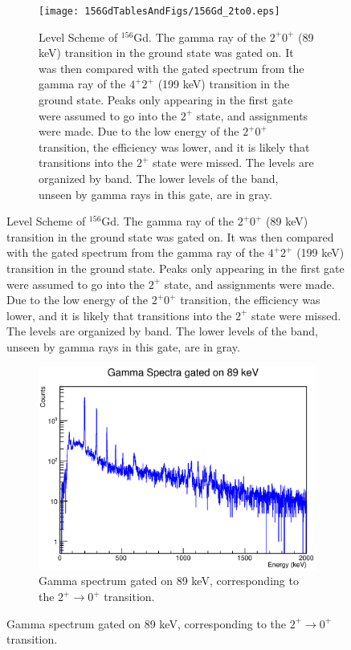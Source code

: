 \begin{figure}[!]
    \centering
    \begin{subfigure}{\textwidth}
    \texttt{[image: 156GdTablesAndFigs/156Gd\_2to0.eps]}
    \caption{\label{fig:156_2to0level}Level Scheme of $^{156}$Gd. The gamma ray of the $2^+$\rightarrow$0^+$ (89 keV) transition in the ground state was gated on. It was then compared with the gated spectrum from the gamma ray of the $4^+$\rightarrow$2^+$ (199 keV) transition in the ground state. Peaks only appearing in the first gate were assumed to go into the $2^+$ state, and assignments were made. Due to the low energy of the $2^+$\rightarrow$0^+$ transition, the efficiency was lower, and it is likely that transitions into the $2^+$ state were missed. The levels are organized by band. The lower levels of the band, unseen by gamma rays in this gate, are in gray.}
    \end{subfigure}
    \label{fig:156_2to0}
    \end{figure}
\begin{landscape}
    \begin{figure}
    \ContinuedFloat
    \begin{subfigure}{1.4\textwidth}
    \includegraphics[]{156GdTablesAndFigs/89GateSpectrum.eps}
    \caption{Gamma spectrum gated on 89 keV, corresponding to the $2^+\rightarrow0^+$ transition.}
    \label{fig:156_2to0spec}
    \end{subfigure}
\end{figure}
\end{landscape}